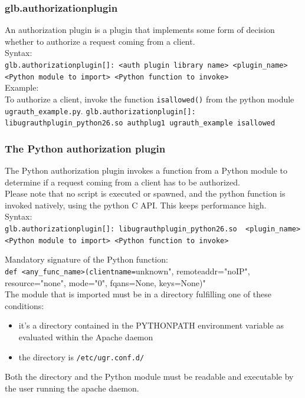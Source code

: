 \documentclass[12pt]{article} %
\begin{document}
\subsubsection{glb.authorizationplugin}
An authorization plugin is a plugin that implements some form of decision whether to authorize a request coming from a client.
\\
Syntax:\\
\lstinline"glb.authorizationplugin[]: <auth plugin library name> <plugin_name>  <Python module to import> <Python function to invoke>"
\\
Example:\\
To authorize a client, invoke the function \lstinline"isallowed()" from the python module \lstinline"ugrauth_example.py".
\lstinline"glb.authorizationplugin[]: libugrauthplugin_python26.so authplug1 ugrauth_example isallowed"




\subsubsection{The Python authorization plugin}
The Python authorization plugin invokes a function from a Python module to determine if a request coming from a client has to be authorized.\\
Please note that no script is executed or spawned, and the python function is invoked natively, using the python C API. This keeps performance high.\\

Syntax:\\
\lstinline"glb.authorizationplugin[]: libugrauthplugin_python26.so  <plugin_name>  <Python module to import> <Python function to invoke>"

Mandatory signature of the Python function:\\
\lstinline"def <any_func_name>(clientname="unknown", remoteaddr="noIP", resource="none", mode="0", fqans=None, keys=None)"\\

The module that is imported must be in a directory fulfilling one of these conditions:\\
\begin{itemize}
 \item it's a directory contained in the PYTHONPATH environment variable as evaluated within the Apache daemon
 \item the directory is \lstinline"/etc/ugr.conf.d/"
\end{itemize}
Both the directory and the Python module must be readable and executable by the user running the apache daemon.\\
\end{document}
